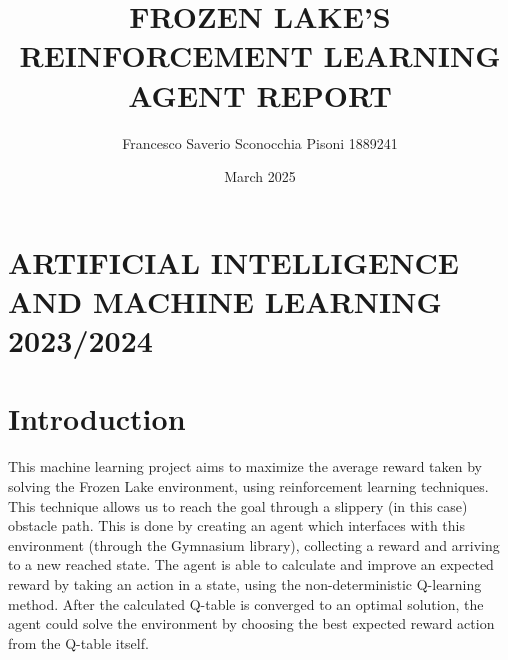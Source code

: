 \documentclass{article}
\title{\Huge FROZEN LAKE'S REINFORCEMENT LEARNING AGENT REPORT}
\author{Francesco Saverio Sconocchia Pisoni 1889241}
\date{March 2025}
\begin{document}
\maketitle

\begin{center}
    \centering
\end{center}

\section*{\centering ARTIFICIAL INTELLIGENCE AND MACHINE LEARNING 2023/2024}
\clearpage


\section{Introduction}

This machine learning project aims to maximize the average reward taken by solving the Frozen Lake environment, using reinforcement learning techniques.
This technique allows us to reach the goal through a slippery (in this case) obstacle path.
This is done by creating an agent which interfaces with this environment (through the Gymnasium library), collecting a reward and arriving to a new reached state.
The agent is able to calculate and improve an expected reward by taking an action in a state, using the non-deterministic Q-learning method.
After the calculated Q-table is converged to an optimal solution, the agent could solve the environment by choosing the best expected reward action from the Q-table itself.

\begin{center}
\centering
{}
\end{center}
\end{document}
